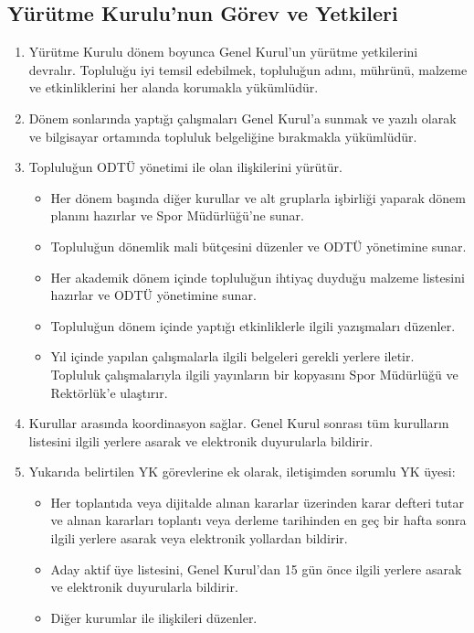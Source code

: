 \documentclass[11pt,a4paper]{article}
\begin{document}
\subsection{Yürütme Kurulu'nun Görev ve Yetkileri}
\begin{enumerate}
    \item Yürütme Kurulu dönem boyunca Genel Kurul’un yürütme yetkilerini devralır. Topluluğu iyi temsil edebilmek, topluluğun adını, mührünü, malzeme ve etkinliklerini her alanda korumakla yükümlüdür.
    \item Dönem sonlarında yaptığı çalışmaları Genel Kurul’a sunmak ve yazılı olarak ve bilgisayar ortamında topluluk belgeliğine bırakmakla yükümlüdür.
    \item Topluluğun ODTÜ yönetimi ile olan ilişkilerini yürütür.
    \begin{itemize}
        \item Her dönem başında diğer kurullar ve alt gruplarla işbirliği yaparak dönem planını hazırlar ve Spor Müdürlüğü’ne sunar.
        \item Topluluğun dönemlik mali bütçesini düzenler ve ODTÜ yönetimine sunar.
        \item Her akademik dönem içinde topluluğun ihtiyaç duyduğu malzeme listesini hazırlar ve ODTÜ yönetimine sunar.
        \item Topluluğun dönem içinde yaptığı etkinliklerle ilgili yazışmaları düzenler.
        \item Yıl içinde yapılan çalışmalarla ilgili belgeleri gerekli yerlere iletir. Topluluk çalışmalarıyla ilgili yayınların bir kopyasını Spor Müdürlüğü ve Rektörlük’e ulaştırır.
    \end{itemize}
    \item Kurullar arasında koordinasyon sağlar. Genel Kurul sonrası tüm kurulların listesini ilgili yerlere asarak ve elektronik duyurularla bildirir.
    \item Yukarıda belirtilen YK görevlerine ek olarak, iletişimden sorumlu YK üyesi:
    \begin{itemize}
        \item Her toplantıda veya dijitalde alınan kararlar üzerinden karar defteri tutar ve alınan kararları toplantı veya derleme tarihinden en geç bir hafta sonra ilgili yerlere asarak veya elektronik yollardan bildirir.
        \item Aday aktif üye listesini, Genel Kurul’dan 15 gün önce ilgili yerlere asarak ve elektronik duyurularla bildirir.
        \item Diğer kurumlar ile ilişkileri düzenler.

\end{itemize}
\end{enumerate}
\end{document}
